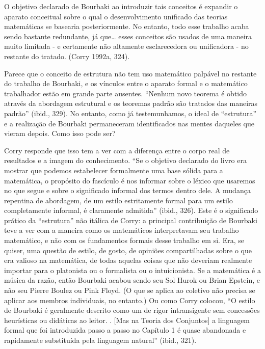 \documentclass[a4paper,12pt]{article}[abntex2]
\begin{document}
O objetivo declarado de Bourbaki ao introduzir tais conceitos é expandir o aparato conceitual sobre o qual o desenvolvimento unificado das teorias matemáticas se basearia posteriormente. No entanto, todo esse trabalho acaba sendo bastante redundante, já que… esses conceitos são usados de uma maneira muito limitada - e certamente não altamente esclarecedora ou unificadora - no restante do tratado. (Corry 1992a, 324).

Parece que o conceito de estrutura não tem uso matemático palpável no restante do trabalho de Bourbaki, e os vínculos entre o aparato formal e o matemático trabalhador estão em grande parte ausentes. “Nenhum novo teorema é obtido através da abordagem estrutural e os teoremas padrão são tratados das maneiras padrão” (ibid., 329). No entanto, como já testemunhamos, o ideal de “estrutura” e a realização de Bourbaki permaneceram identificados nas mentes daqueles que vieram depois. Como isso pode ser?

Corry responde que isso tem a ver com a diferença entre o corpo real de resultados e a imagem do conhecimento. “Se o objetivo declarado do livro era mostrar que podemos estabelecer formalmente uma base sólida para a matemática, o propósito do fascículo é nos informar sobre o léxico que usaremos no que segue e sobre o significado informal dos termos dentro dele. A mudança repentina de abordagem, de um estilo estritamente formal para um estilo completamente informal, é claramente admitida” (ibid., 326). Este é o significado prático da “estrutura” não itálica de Corry: a principal contribuição de Bourbaki teve a ver com a maneira como os matemáticos interpretavam seu trabalho matemático, e não com os fundamentos formais desse trabalho em si. Era, se quiser, uma questão de estilo, de gosto, de opiniões compartilhadas sobre o que era valioso na matemática, de todas aquelas coisas que não deveriam realmente importar para o platonista ou o formalista ou o intuicionista. Se a matemática é a música da razão, então Bourbaki acabou sendo seu Sol Hurok ou Brian Epstein, e não seu Pierre Boulez ou Pink Floyd. (O que se aplica ao coletivo não precisa se aplicar aos membros individuais, no entanto.) Ou como Corry colocou, “O estilo de Bourbaki é geralmente descrito como um de rigor intransigente sem concessões heurísticas ou didáticas ao leitor. . [Mas na Teoria dos Conjuntos] a linguagem formal que foi introduzida passo a passo no Capítulo 1 é quase abandonada e rapidamente substituída pela linguagem natural” (ibid., 321).
\end{document}
